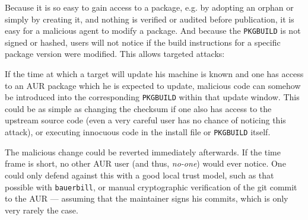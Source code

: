 Because it is so easy to gain access to a package, e.g. by adopting an orphan or simply by creating it, and nothing is verified or audited before publication, it is easy for a malicious agent to modify a package.
And because the \texttt{PKGBUILD} is not signed or hashed, users will not notice if the build instructions for a specific package version were modified. This allows targeted attacks:

If the time at which a target will update his machine is known and one has access to an AUR package which he is expected to update, malicious code can somehow be introduced into the corresponding \texttt{PKGBUILD} within that update window.
This could be as simple as changing the checksum if one also has access to the upstream source code (even a very careful user has no chance of noticing this attack), or executing innocuous code in the install file or \texttt{PKGBUILD} itself.

The malicious change could be reverted immediately afterwards. If the time frame is short, no other AUR user (and thus, \emph{no-one}) would ever notice.
One could only defend against this with a good local trust model, such as that possible with \texttt{bauerbill}, or manual cryptographic verification of the git commit to the AUR --- assuming that the maintainer signs his commits, which is only very rarely the case.

